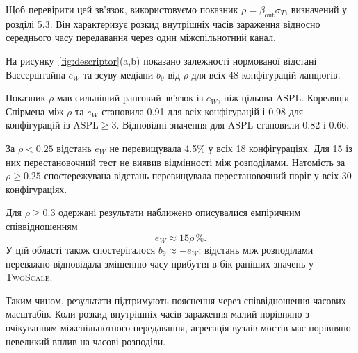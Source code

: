 \documentclass[a4paper,fleqn]{cas-sc}
\newcommand{\TS}{\textup{\textsc{TwoScale}}}
\newcommand{\eW}{e_{W}}
\begin{document}
Щоб перевірити цей зв'язок,
використовуємо показник
$\rho=\beta_{\mathrm{out}}\sigma_T$,
визначений у розділі 5.3.
Він характеризує розкид
внутрішніх часів зараження
відносно середнього часу
передавання через один
міжспільнотний канал.

На рисунку~\ref{fig:descriptor}(a,b)
показано залежності нормованої
відстані Вассерштайна $\eW$
та зсуву медіани $b_9$
від $\rho$ для всіх
48 конфігурацій ланцюгів.

Показник $\rho$ мав сильніший
ранговий зв'язок із $\eW$,
ніж цільова ASPL.
Кореляція Спірмена між
$\rho$ та $\eW$ становила
0.91 для всіх конфігурацій
і 0.98 для конфігурацій
із $\mathrm{ASPL}\geq3$.
Відповідні значення
для ASPL становили 0.82 і 0.66.

За $\rho<0.25$ відстань $\eW$
не перевищувала 4.5\%
у всіх 18 конфігураціях.
Для 15 із них перестановочний
тест не виявив відмінності
між розподілами.
Натомість за $\rho\geq0.25$
спостережувана відстань
перевищувала перестановочний
поріг у всіх 30 конфігураціях.

Для $\rho\geq0.3$
одержані результати наближено
описувалися емпіричним
співвідношенням
\begin{equation}
\eW \approx 15\rho\,\%.
\end{equation}
У цій області також
спостерігалося
$b_9\approx-\eW$:
відстань між розподілами
переважно відповідала
зміщенню часу прибуття
в бік раніших значень
у \TS{}.

Таким чином, результати
підтримують пояснення
через співвідношення
часових масштабів.
Коли розкид внутрішніх
часів зараження малий
порівняно з очікуванням
міжспільнотного передавання,
агрегація вузлів-мостів
має порівняно невеликий
вплив на часові розподіли.
\end{document}
